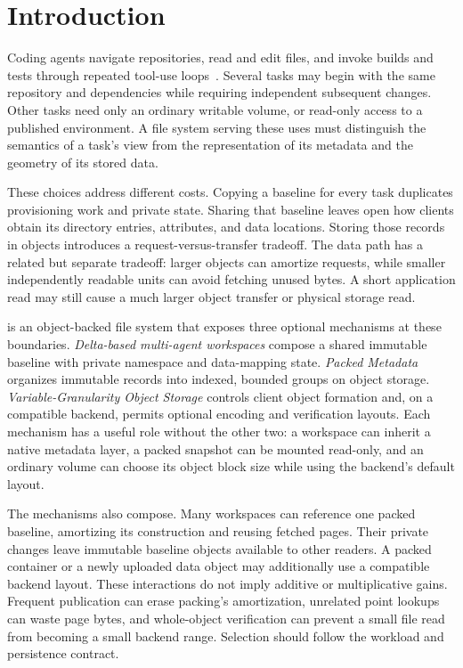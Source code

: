 \section{Introduction}
\label{sec:intro}

Coding agents navigate repositories, read and edit files, and invoke builds
and tests through repeated tool-use loops~\cite{sweagent2024,openhands2025}.
Several tasks may begin with the same repository and dependencies while
requiring independent subsequent changes. Other tasks need only an ordinary
writable volume, or read-only access to a published environment. A file system
serving these uses must distinguish the semantics of a task's view from the
representation of its metadata and the geometry of its stored data.

These choices address different costs. Copying a baseline for every task
duplicates provisioning work and private state. Sharing that baseline leaves
open how clients obtain its directory entries, attributes, and data locations.
Storing those records in objects introduces a request-versus-transfer tradeoff.
The data path has a related but separate tradeoff: larger objects can amortize
requests, while smaller independently readable units can avoid fetching
unused bytes. A short application read may still cause a much larger object
transfer or physical storage read.

\sys is an object-backed file system that exposes three optional mechanisms
at these boundaries. \emph{Delta-based multi-agent workspaces} compose a
shared immutable baseline with private namespace and data-mapping state.
\emph{Packed Metadata} organizes immutable records into indexed, bounded
groups on object storage. \emph{Variable-Granularity Object Storage} controls
client object formation and, on a compatible backend, permits optional
encoding and verification layouts. Each mechanism has a useful role without
the other two: a workspace can inherit a native metadata layer, a packed
snapshot can be mounted read-only, and an ordinary volume can choose its
object block size while using the backend's default layout.

The mechanisms also compose. Many workspaces can reference one packed
baseline, amortizing its construction and reusing fetched pages. Their private
changes leave immutable baseline objects available to other readers. A packed
container or a newly uploaded data object may additionally use a compatible
backend layout. These interactions do not imply additive or multiplicative
gains. Frequent publication can erase packing's amortization, unrelated point
lookups can waste page bytes, and whole-object verification can prevent a
small file read from becoming a small backend range. Selection should follow
the workload and persistence contract.

